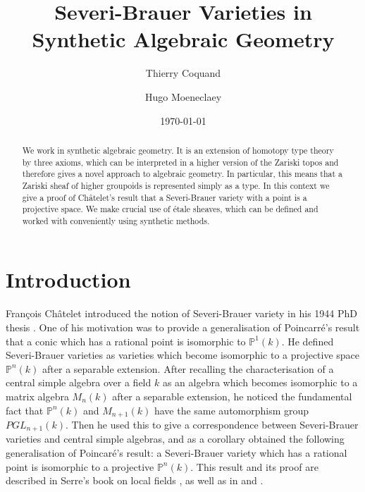 \documentclass[10pt,a4paper]{article}
\theoremstyle{definition}
\newcommand{\bP}{\mathbb{P}}
\begin{document}
\title{Severi-Brauer Varieties in Synthetic Algebraic Geometry}

\author{Thierry Coquand}
\author{Hugo Moeneclaey}
\date{\today}
\maketitle


\begin{abstract}
We work in synthetic algebraic geometry. It is an extension of homotopy type theory by three axioms, which can be interpreted in a higher version of the Zariski topos and therefore gives a novel approach to algebraic geometry. In particular, this means that a Zariski sheaf of higher groupoids is represented simply as a type. In this context we give a proof of Ch\^atelet's result that a Severi-Brauer variety with a point is a projective space. We make crucial use of étale sheaves, which can be defined and worked with conveniently using synthetic methods.
\end{abstract}

\tableofcontents


\section*{Introduction}

{F}ran\c cois {C}h\^atelet introduced the notion of Severi-Brauer variety in his 1944 PhD thesis
\cite{chatelet44}. One of his motivation was to provide
a generalisation of Poincarr\'e's result that a conic which has a rational point is isomorphic to $\bP^1(k)$.
He defined Severi-Brauer varieties as varieties which become isomorphic to a projective space $\bP^n(k)$ after
a separable extension. After recalling the characterisation of a central simple algebra over a field $k$ as
an algebra which becomes isomorphic to a matrix algebra $M_n(k)$ after a separable extension, he noticed the fundamental
fact that $\bP^{n}(k)$ and $M_{n+1}(k)$ have the same automorphism group $PGL_{n+1}(k)$. Then he used this
to give a correspondence between Severi-Brauer varieties and central simple algebras, and as a corollary
obtained the following generalisation of Poincar\'e's result: a Severi-Brauer variety which has a rational point
is isomorphic to a projective $\bP^{n}(k)$. This result and its proof are described in Serre's book on local fields \cite{serre62}, as well as in \cite{colliot88} and \cite{gille2017central}.
\end{document}
